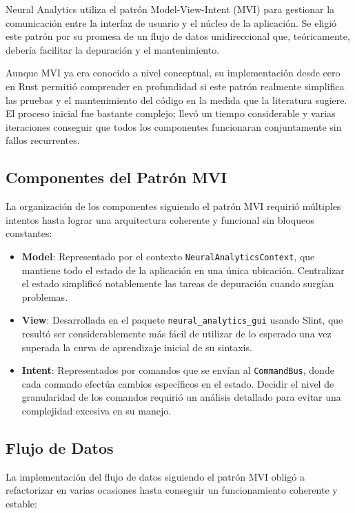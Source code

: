 Neural Analytics utiliza el patrón Model-View-Intent (MVI) para gestionar la comunicación entre la interfaz de usuario y el núcleo de la aplicación. Se eligió este patrón por su promesa de un flujo de datos unidireccional que, teóricamente, debería facilitar la depuración y el mantenimiento.

Aunque MVI ya era conocido a nivel conceptual, su implementación desde cero en Rust permitió comprender en profundidad si este patrón realmente simplifica las pruebas y el mantenimiento del código en la medida que la literatura sugiere. El proceso inicial fue bastante complejo; llevó un tiempo considerable y varias iteraciones conseguir que todos los componentes funcionaran conjuntamente sin fallos recurrentes.

\subsection{Componentes del Patrón MVI}

La organización de los componentes siguiendo el patrón MVI requirió múltiples intentos hasta lograr una arquitectura coherente y funcional sin bloqueos constantes:

\begin{itemize}
    \item \textbf{Model}: Representado por el contexto \texttt{NeuralAnalyticsContext}, que mantiene todo el estado de la aplicación en una única ubicación. Centralizar el estado simplificó notablemente las tareas de depuración cuando surgían problemas.
    \item \textbf{View}: Desarrollada en el paquete \texttt{neural\_analytics\_gui} usando Slint, que resultó ser considerablemente más fácil de utilizar de lo esperado una vez superada la curva de aprendizaje inicial de su sintaxis.
    \item \textbf{Intent}: Representados por comandos que se envían al \texttt{CommandBus}, donde cada comando efectúa cambios específicos en el estado. Decidir el nivel de granularidad de los comandos requirió un análisis detallado para evitar una complejidad excesiva en su manejo.
\end{itemize}

\subsection{Flujo de Datos}

La implementación del flujo de datos siguiendo el patrón MVI obligó a refactorizar en varias ocasiones hasta conseguir un funcionamiento coherente y estable:

